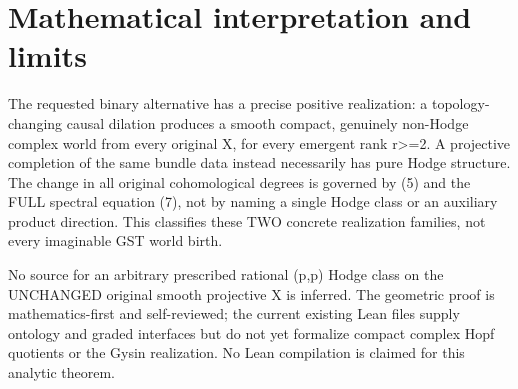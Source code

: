 \documentclass[11pt]{article}
\begin{document}
\section{Mathematical interpretation and limits}
The requested binary alternative has a precise positive realization:
a topology-changing causal dilation produces a smooth compact,
genuinely non-Hodge complex world from every original X, for
every emergent rank r>=2. A projective completion of the same
bundle data instead necessarily has pure Hodge structure.
The change in all original cohomological degrees is governed
by (5) and the FULL spectral equation (7), not by naming
a single Hodge class or an auxiliary product direction.
This classifies these TWO concrete realization families, not
every imaginable GST world birth.

No source for an arbitrary prescribed rational (p,p) Hodge class
on the UNCHANGED original smooth projective X is inferred.
The geometric proof is mathematics-first and self-reviewed;
the current existing Lean files supply ontology and graded
interfaces but do not yet formalize compact complex Hopf
quotients or the Gysin realization. No Lean compilation is
claimed for this analytic theorem.
\end{document}
